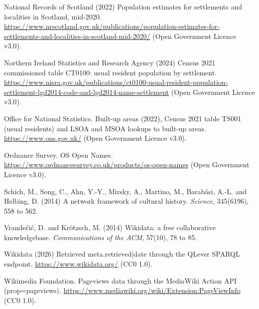 \documentclass[11pt,a4paper]{article}
\begin{document}
National Records of Scotland (2022) Population estimates for settlements and localities in Scotland, mid-2020. \url{https://www.nrscotland.gov.uk/publications/population-estimates-for-settlements-and-localities-in-scotland-mid-2020/} (Open Government Licence v3.0).

Northern Ireland Statistics and Research Agency (2024) Census 2021 commissioned table CT0100: usual resident population by settlement. \url{https://www.nisra.gov.uk/publications/ct0100-usual-resident-population-settlement-lgd2014-code-and-lgd2014-name-settlement} (Open Government Licence v3.0).

Office for National Statistics. Built-up areas (2022), Census 2021 table TS001 (usual residents) and LSOA and MSOA lookups to built-up areas. \url{https://www.ons.gov.uk/} (Open Government Licence v3.0).

Ordnance Survey. OS Open Names. \url{https://www.ordnancesurvey.co.uk/products/os-open-names} (Open Government Licence v3.0).

Schich, M., Song, C., Ahn, Y.-Y., Mirsky, A., Martino, M., Barabási, A.-L. and Helbing, D. (2014) A network framework of cultural history. \emph{Science}, 345(6196), 558 to 562.

Vrandečić, D. and Krötzsch, M. (2014) Wikidata: a free collaborative knowledgebase. \emph{Communications of the ACM}, 57(10), 78 to 85.

Wikidata (2026) Retrieved {{meta.retrieved|date}} through the QLever SPARQL endpoint. \url{https://www.wikidata.org/} (CC0 1.0).

Wikimedia Foundation. Pageviews data through the MediaWiki Action API (prop=pageviews). \url{https://www.mediawiki.org/wiki/Extension:PageViewInfo} (CC0 1.0).
\end{document}
